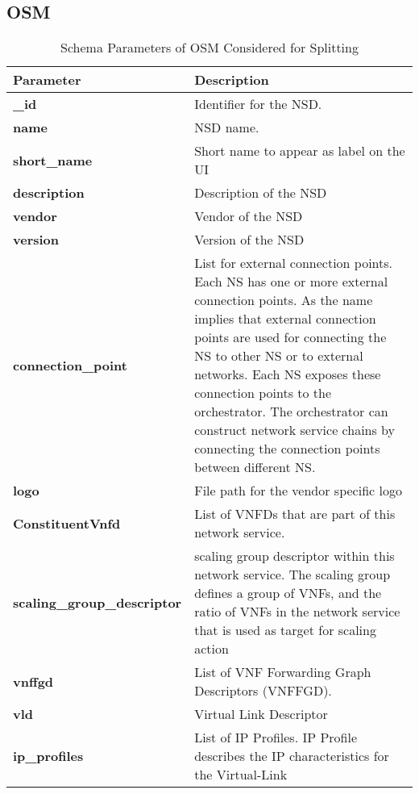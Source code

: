 \subsection{OSM}
\begin{table}[H] \cite{OSMSchemaDocumentation}
	\begin{center}
		\caption{Schema Parameters of OSM Considered for Splitting}
		\label{tab:table2}
		\begin{tabular}{l|l} 
			\textbf{Parameter} & \textbf{Description} \\
			\hline
			\textbf{\_id} & Identifier for the NSD. \\ 
			\textbf{name} & NSD name. \\
			\textbf{short_name} & Short name to appear as label on the UI \\
			\textbf{description} & Description of the NSD \\
			\textbf{vendor} & Vendor of the NSD \\
			\textbf{version} & Version of the NSD \\
			\textbf{connection_point} & List for external connection points.
Each NS has one or more external connection
points. As the name implies that external
connection points are used for connecting
the NS to other NS or to external networks.
Each NS exposes these connection points to
the orchestrator. The orchestrator can
construct network service chains by
connecting the connection points between
different NS. \\
			\textbf{logo} & File path for the vendor specific logo \\
			\textbf{ConstituentVnfd} & List of VNFDs that are part of this
network service. \\
			\textbf{scaling_group_descriptor} & scaling group descriptor within this network service.
The scaling group defines a group of VNFs,
and the ratio of VNFs in the network service
that is used as target for scaling action \\
			\textbf{vnffgd} & List of VNF Forwarding Graph Descriptors (VNFFGD). \\
			\textbf{vld} & Virtual Link Descriptor \\
			\textbf{ip_profiles} & List of IP Profiles.
  IP Profile describes the IP characteristics for the Virtual-Link \\
		\end{tabular}
	\end{center}
\end{table}
